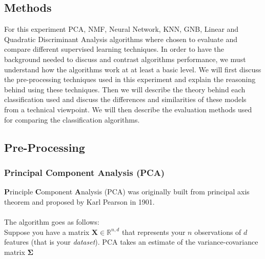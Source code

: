\documentclass{article}
\begin{document}
\begin{multicols}{2}
\section{Methods}
For this experiment PCA, NMF, Neural Network, KNN, GNB, Linear and Quadratic Discriminant Analysis algorithms where chosen to evaluate and compare different supervised learning techniques. In order to have the background needed to discuss and contrast algorithms performance, we must understand how the algorithms work at at least a basic level. We will first discuss the pre-processing techniques used in this experiment and explain the reasoning behind using these techniques. Then we will describe the theory behind each classification used and discuss the differences and similarities of these models from a technical viewpoint. We will then describe the evaluation methods used for comparing the classification algorithms. 

\subsection{Pre-Processing}
\subsubsection{Principal Component Analysis (PCA)}
\textbf Principle \textbf Component \textbf Analysis (PCA) was originally built from principal axis theorem and proposed by  Karl Pearson in 1901\cite{PCA}. 
\\\\
The algorithm goes as follows:\\
Suppose you have a matrix $\mathbf X \in \mathbb{R}^{n, d}$ that represents your $n$ observations of $d$ features (that is your \emph{dataset}).
PCA takes an estimate of the variance-covariance matrix $\mathbf \Sigma$


\end{multicols}
\end{document}
